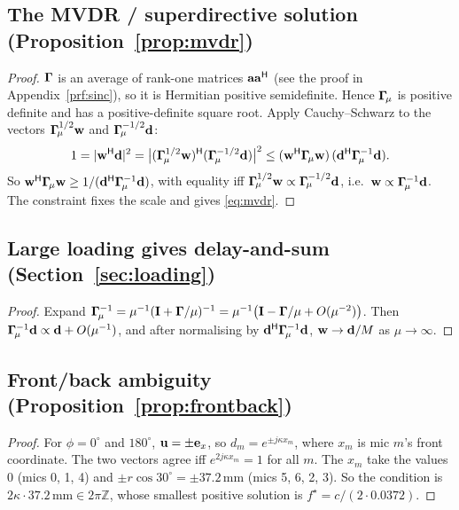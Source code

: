 \documentclass[11pt]{article}
\begin{document}
\subsection{The MVDR / superdirective solution (Proposition~\ref{prop:mvdr})}\label{prf:mvdr}
\begin{proof}
$\bm{\Gamma}$ is an average of rank-one matrices $\mathbf a\mathbf a^{\mathsf H}$ (see the proof in
Appendix~\ref{prf:sinc}), so it is Hermitian positive semidefinite. Hence $\bm{\Gamma}_{\!\mu}$ is
positive definite and has a positive-definite square root. Apply Cauchy--Schwarz to the
vectors $\bm{\Gamma}_{\!\mu}^{1/2}\mathbf{w}$ and $\bm{\Gamma}_{\!\mu}^{-1/2}\mathbf{d}$:
\[
  1=|\mathbf{w}^{\mathsf H}\mathbf{d}|^2=\big|(\bm{\Gamma}_{\!\mu}^{1/2}\mathbf{w})^{\mathsf H}(\bm{\Gamma}_{\!\mu}^{-1/2}\mathbf{d})\big|^2
  \le(\mathbf{w}^{\mathsf H}\bm{\Gamma}_{\!\mu}\mathbf{w})\,(\mathbf{d}^{\mathsf H}\bm{\Gamma}_{\!\mu}^{-1}\mathbf{d}).
\]
So $\mathbf{w}^{\mathsf H}\bm{\Gamma}_{\!\mu}\mathbf{w}\ge1/(\mathbf{d}^{\mathsf H}\bm{\Gamma}_{\!\mu}^{-1}\mathbf{d})$, with equality iff
$\bm{\Gamma}_{\!\mu}^{1/2}\mathbf{w}\propto\bm{\Gamma}_{\!\mu}^{-1/2}\mathbf{d}$, i.e.\ $\mathbf{w}\propto\bm{\Gamma}_{\!\mu}^{-1}\mathbf{d}$. The constraint fixes the
scale and gives \eqref{eq:mvdr}.
\end{proof}

\subsection{Large loading gives delay-and-sum (Section~\ref{sec:loading})}\label{prf:limit}
\begin{proof}
Expand $\bm{\Gamma}_{\!\mu}^{-1}=\mu^{-1}(\mathbf{I}+\bm{\Gamma}/\mu)^{-1}=\mu^{-1}\big(\mathbf{I}-\bm{\Gamma}/\mu+O(\mu^{-2})\big)$. Then
$\bm{\Gamma}_{\!\mu}^{-1}\mathbf{d}\propto\mathbf{d}+O(\mu^{-1})$, and after normalising by $\mathbf{d}^{\mathsf H}\bm{\Gamma}_{\!\mu}^{-1}\mathbf{d}$,
$\mathbf{w}\to\mathbf{d}/M$ as $\mu\to\infty$.
\end{proof}

\subsection{Front/back ambiguity (Proposition~\ref{prop:frontback})}\label{prf:frontback}
\begin{proof}
For $\phi=0^\circ$ and $180^\circ$, $\mathbf{u}=\pm\mathbf e_x$, so $d_m=e^{\pm j\kappa x_m}$, where
$x_m$ is mic $m$'s front coordinate. The two vectors agree iff $e^{2j\kappa x_m}=1$ for all
$m$. The $x_m$ take the values $0$ (mics 0, 1, 4) and $\pm r\cos30^\circ=\pm37.2$\,mm (mics
5, 6, 2, 3). So the condition is $2\kappa\cdot37.2\,\text{mm}\in2\pi\mathbb Z$, whose smallest
positive solution is $f^\star=c/(2\cdot0.0372)$.
\end{proof}
\end{document}
